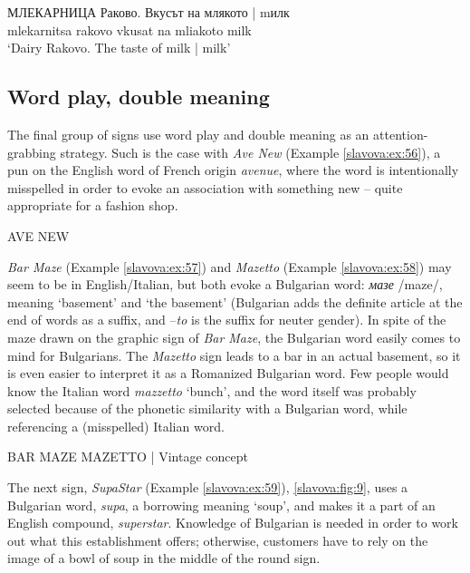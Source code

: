 \documentclass[output=paper]{langscibook}
\begin{document}
\begin{exe}
  \ex\label{slavova:ex:55}
  \gll МЛЕКАРНИЦА Раково. Вкусът на млякото | mилк \\
  mlekarnitsa rakovo vkusat na mliakoto { } milk \\
  \glt ‘Dairy Rakovo. The taste of milk | milk’
\end{exe}

\subsection{Word play, double meaning}
The final group of signs use word play and double meaning as an attention-grabbing strategy. Such is the case with \textit{Ave New} (Example \ref{slavova:ex:56}), a pun on the English word of French origin \textit{avenue}, where the word is intentionally misspelled in order to evoke an association with something new – quite appropriate for a fashion shop.

\begin{exe}
  \ex\label{slavova:ex:56} AVE NEW
\end{exe}

\noindent
\textit{Bar Maze} (Example \ref{slavova:ex:57}) and \textit{Mazetto} 
(Example \ref{slavova:ex:58}) may seem to be in English/Ital\-ian, but both evoke a Bulgarian word: \textit{мазе} /maze/, meaning ‘basement’ and ‘the basement’ (Bulgarian adds the definite article at the end of words as a suffix, and –\textit{to} is the suffix for neuter gender). In spite of the maze drawn on the graphic sign of \textit{Bar Maze}, the Bulgarian word easily comes to mind for Bulgarians. The \textit{Mazetto} sign leads to a bar in an actual basement, so it is even easier to interpret it as a Romanized Bulgarian word. Few people would know the Italian word \textit{mazzetto} ‘bunch’, and the word itself was probably selected because of the phonetic similarity with a Bulgarian word, while referencing a (misspelled) Italian word.

\begin{exe}
  \ex\label{slavova:ex:57} BAR MAZE
  \ex\label{slavova:ex:58} MAZETTO | Vintage concept
\end{exe}

\noindent
The next sign, \textit{SupaStar} (Example \ref{slavova:ex:59}), \autoref{slavova:fig:9}, uses a Bulgarian word, \textit{supa}, a borrowing meaning ‘soup’, and makes it a part of an English compound, \textit{superstar}. Knowledge of Bulgarian is needed in order to work out what this establishment offers; otherwise, customers have to rely on the image of a bowl of soup in the middle of the round sign.
\end{document}
